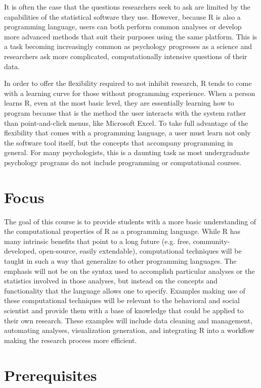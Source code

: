 \documentclass[11pt]{article}
\begin{document}
It is often the case that the questions researchers seek to ask are limited by the capabilities of the statistical software they use.  However, because R is also a programming language, users can both perform common analyses or develop more advanced methods that suit their purposes using the same platform.  This is a task becoming increasingly common as psychology progresses as a science and researchers ask more complicated, computationally intensive questions of their data.

In order to offer the flexibility required to not inhibit research, R tends to come with a learning curve for those without programming experience.  When a person learns R, even at the most basic level, they are essentially learning how to program because that is the method the user interacts with the system rather than point-and-click menus, like Microsoft Excel.  To take full advantage of the flexibility that comes with a programming language, a user must learn not only the software tool itself, but the concepts that accompany programming in general.  For many psychologists, this is a daunting task as most undergraduate psychology programs do not include programming or computational courses.  

\section{Focus}

The goal of this course is to provide students with a more basic understanding of the computational properties of R as a programming language.  While R has many intrinsic benefits that point to a long future (e.g. free, community-developed, open-source, easily extendable), computational techniques will be taught in such a way that generalize to other programming languages. The emphasis will not be on the syntax used to accomplish particular analyses or the statistics involved in those analyses, but instead on the concepts and functionality that the language allows one to specify.  Examples making use of these computational techniques will be relevant to the behavioral and social scientist and provide them with a base of knowledge that could be applied to their own research.  These examples will include data cleaning and management, automating analyses, visualization generation, and integrating R into a workflow making the research process more efficient.

\section{Prerequisites}
\end{document}
